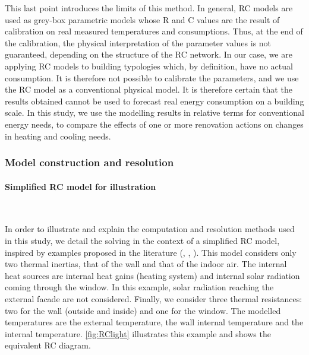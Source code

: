 \documentclass[11pt]{article}
\begin{document}
        This last point introduces the limits of this method. In general, RC models are used as grey-box parametric models whose R and C values are the result of calibration on real measured temperatures and consumptions. Thus, at the end of the calibration, the physical interpretation of the parameter values is not guaranteed, depending on the structure of the RC network. In our case, we are applying RC models to building typologies which, by definition, have no actual consumption. It is therefore not possible to calibrate the parameters, and we use the RC model as a conventional physical model. It is therefore certain that the results obtained cannot be used to forecast real energy consumption on a building scale. In this study, we use the modelling results in relative terms for conventional energy needs, to compare the effects of one or more renovation actions on changes in heating and cooling needs.  


        \subsubsection{Model construction and resolution} %
        \label{ssub:model_construction}

        \paragraph{Simplified RC model for illustration}\mbox{}\\ %
        \label{par:simplified_rc_model}

        In order to illustrate and explain the computation and resolution methods used in this study, we detail the solving in the context of a simplified RC model, inspired by examples proposed in the literature (\cite{madsen_estimation_1995}, \cite{bacher_identifying_2011}, \cite{rouchier_solving_2018}). This model considers only two thermal inertias, that of the wall and that of the indoor air. The internal heat sources are internal heat gains (heating system) and internal solar radiation coming through the window. In this example, solar radiation reaching the external facade are not considered. Finally, we consider three thermal resistances: two for the wall (outside and inside) and one for the window. The modelled temperatures are the external temperature, the wall internal temperature and the internal temperature. \ref{fig:RClight} illustrates this example and shows the equivalent RC diagram. 
\end{document}
